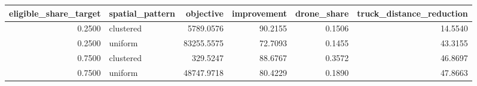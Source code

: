 \begin{tabular}{rlrrrr}
\toprule
eligible_share_target & spatial_pattern & objective & improvement & drone_share & truck_distance_reduction \\
\midrule
0.2500 & clustered & 5789.0576 & 90.2155 & 0.1506 & 14.5540 \\
0.2500 & uniform & 83255.5575 & 72.7093 & 0.1455 & 43.3155 \\
0.7500 & clustered & 329.5247 & 88.6767 & 0.3572 & 46.8697 \\
0.7500 & uniform & 48747.9718 & 80.4229 & 0.1890 & 47.8663 \\
\bottomrule
\end{tabular}
